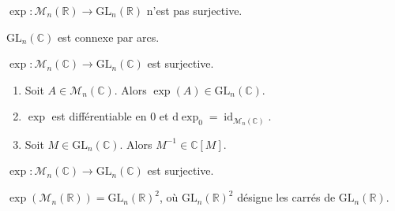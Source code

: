   \begin{application}
    $\exp : \mathcal{M}_n(\mathbb{R}) \rightarrow \mathrm{GL}_n(\mathbb{R})$ n'est pas surjective.
  \end{application}


  \begin{proposition}
    $\mathrm{GL}_n(\mathbb{C})$ est connexe par arcs.
  \end{proposition}

  \begin{application}
    $\exp : \mathcal{M}_n(\mathbb{C}) \rightarrow \mathrm{GL}_n(\mathbb{C})$ est surjective.
  \end{application}


  \begin{lemma}
    \begin{enumerate}[label=(\roman*)]
      \item Soit $A \in \mathcal{M}_n(\mathbb{C})$. Alors $\exp(A) \in \mathrm{GL}_n(\mathbb{C})$.
      \item $\exp$ est différentiable en $0$ et $\mathrm{d}\exp_0 = \operatorname{id}_{\mathcal{M}_n(\mathbb{C})}$.
      \item Soit $M \in \mathrm{GL}_n(\mathbb{C})$. Alors $M^{-1} \in \mathbb{C}[M]$.
    \end{enumerate}
  \end{lemma}


  \begin{theorem}
    $\exp : \mathcal{M}_n(\mathbb{C}) \rightarrow \mathrm{GL}_n(\mathbb{C})$ est surjective.
  \end{theorem}

  \begin{application}
    $\exp(\mathcal{M}_n(\mathbb{R})) = \mathrm{GL}_n(\mathbb{R})^2$, où $\mathrm{GL}_n(\mathbb{R})^2$ désigne les carrés de $\mathrm{GL}_n(\mathbb{R})$.
  \end{application}


